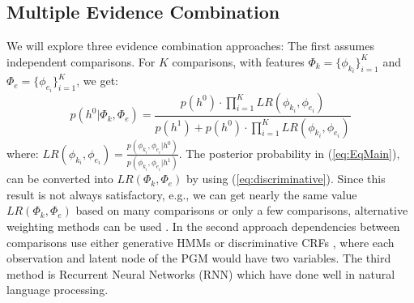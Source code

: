 \documentclass[11pt, doublespacing]{article}
\begin{document}
\subsection{Multiple Evidence Combination}
We will explore three evidence combination approaches:
The first assumes  independent comparisons.
For  $K$ comparisons, with features  $\Phi_{k}=\{ \phi_{k_i} \}^{K}_{i=1}$ and $\Phi_{e}=\{ \phi_{e_i} \}^{K}_{i=1}$, we get:
\begin{equation}
\label{eq:EqMain}
p(h^{0}|\Phi_{k} , \Phi_{e}) = \dfrac{p(h^{0})\cdot \prod_{i=1}^{K}LR(\phi_{k_i}, \phi_{e_i})}{p(h^{1}) + p(h^{0})\cdot \prod_{i=1}^{K} LR(\phi_{k_i},\phi_{e_i})}
\end{equation}
where:
$LR(\phi_{k_i},\phi_{e_i}) = \frac{p(\phi_{k_i},\phi_{e_i}|h^{0})}{p(\phi_{k_i},\phi_{e_i}|h^{1})}$. The posterior probability in  (\ref{eq:EqMain}),  can be converted into  $LR(\Phi_{k},\Phi_{e})$ by using (\ref{eq:discriminative}).
Since  this result is not always satisfactory, e.g., we can get nearly the same value $LR(\Phi_{k}, \Phi_{e})$ based on many comparisons or only a few  comparisons, alternative weighting methods can be used \cite{Kovalenko2012}. In the second approach  dependencies between comparisons use either generative HMMs or discriminative CRFs \cite{Koller2009}, where each observation and latent node of the PGM would have two variables. The third method  is Recurrent Neural Networks (RNN) which have done well in natural language processing\cite{LeCun2015}.
\end{document}
